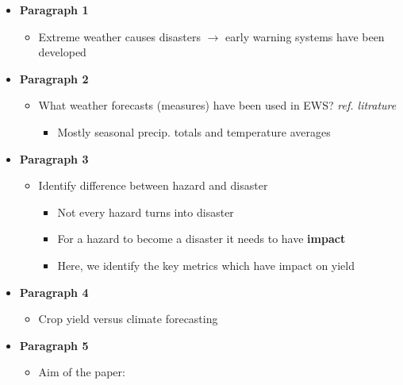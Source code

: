 \documentclass[a4paper,12pt]{article}
\begin{document}
\begin{itemize}
\color{blue}
\item[] \textbf{Paragraph 1}

\begin{itemize}

\item Extreme weather causes disasters $\rightarrow$	 early warning systems have been developed
\end{itemize}
\item[] \textbf{Paragraph 2}
\begin{itemize}
\item What weather forecasts (measures) have been used in EWS? \textit{ref. litrature}
\begin{itemize}
\item Mostly seasonal precip. totals and temperature averages
\end{itemize}
\end{itemize}

\item[] \textbf{Paragraph 3} 
\begin{itemize}

\item Identify difference between hazard and disaster

\begin{itemize}
\item Not every hazard turns into disaster
\item For a hazard to become a disaster it needs to have \textbf{impact}
\item Here, we identify the key metrics which have impact on yield
\end{itemize}

\end{itemize}

\item[] \textbf{Paragraph 4}
\begin{itemize}
\item Crop yield versus climate forecasting
\end{itemize}


 \item[] \textbf{Paragraph 5}
\begin{itemize}
\item Aim of the paper:

\color{red}



\end{itemize}
\end{itemize}
\end{document}
